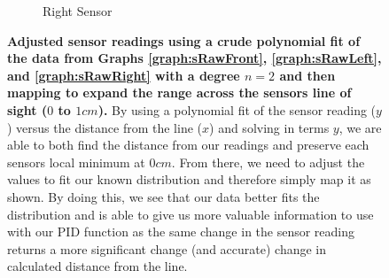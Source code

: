 \documentclass[]{report}
\begin{document}
\begin{figure}
{\begin{subfigure}{0.45\textwidth}
				\caption{Right Sensor}
				\label{graph:sMappedRight}
			\end{subfigure}
			\caption{\textbf{Adjusted sensor readings using a crude polynomial fit of the data from Graphs \ref{graph:sRawFront}, \ref{graph:sRawLeft}, and \ref{graph:sRawRight} with a degree $n=2$ and then mapping to expand the range across the sensors line of sight ($0$ to $1cm$).} By using a polynomial fit of the sensor reading ($y$) versus the distance from the line ($x$) and solving in terms $y$, we are able to both find the distance from our readings and preserve each sensors local minimum at $0cm$. From there, we need to adjust the values to fit our known distribution and therefore simply map it as shown. By doing this, we see that our data better fits the distribution and is able to give us more valuable information to use with our PID function as the same change in the sensor reading returns a more significant change (and accurate) change in calculated distance from the line.}%
		}
		\label{graph:sMapped}
	\end{figure}
\end{document}
